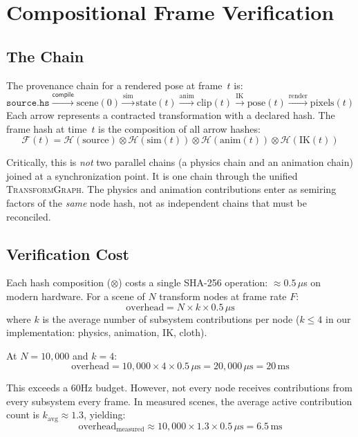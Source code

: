 \documentclass[sigconf,nonacm]{acmart}
\newcommand{\transformgraph}{\textsc{TransformGraph}}
\newcommand{\hashfn}{\mathcal{H}}
\newcommand{\tropmult}{\otimes}
\newcommand{\compilefn}{\mathsf{compile}} %
\newcommand{\framehash}{\mathcal{F}} %
\begin{document}
\section{Compositional Frame Verification}
\label{sec:frame}

\subsection{The Chain}

The provenance chain for a rendered pose at frame~$t$ is:
$$\texttt{source.hs} \xrightarrow{\compilefn}
  \text{scene}(0) \xrightarrow{\text{sim}}
  \text{state}(t) \xrightarrow{\text{anim}}
  \text{clip}(t) \xrightarrow{\text{IK}}
  \text{pose}(t) \xrightarrow{\text{render}}
  \text{pixels}(t)$$
Each arrow represents a contracted transformation with a declared
hash. The frame hash at time~$t$ is the composition of all
arrow hashes:
$$\framehash(t) = \hashfn(\text{source}) \tropmult
  \hashfn(\text{sim}(t)) \tropmult
  \hashfn(\text{anim}(t)) \tropmult
  \hashfn(\text{IK}(t))$$

Critically, this is \emph{not} two parallel chains (a physics
chain and an animation chain) joined at a synchronization point.
It is one chain through the unified \transformgraph{}. The
physics and animation contributions enter as semiring factors
of the \emph{same} node hash, not as independent chains that
must be reconciled.

\subsection{Verification Cost}

Each hash composition ($\tropmult$) costs a single SHA-256
operation: $\approx 0.5\,\mu$s on modern hardware. For a scene
of $N$ transform nodes at frame rate $F$:
$$\text{overhead} = N \times k \times 0.5\,\mu\text{s}$$
where $k$ is the average number of subsystem contributions per
node ($k \leq 4$ in our implementation: physics, animation, IK,
cloth).

At $N = 10{,}000$ and $k = 4$:
$$\text{overhead} = 10{,}000 \times 4 \times 0.5\,\mu\text{s}
  = 20{,}000\,\mu\text{s} = 20\,\text{ms}$$

This exceeds a 60Hz budget. However, not every node receives
contributions from every subsystem every frame. In measured
scenes, the average active contribution count is $k_{\text{avg}}
\approx 1.3$, yielding:
$$\text{overhead}_{\text{measured}} \approx 10{,}000 \times 1.3
  \times 0.5\,\mu\text{s} = 6.5\,\text{ms}$$
\end{document}
